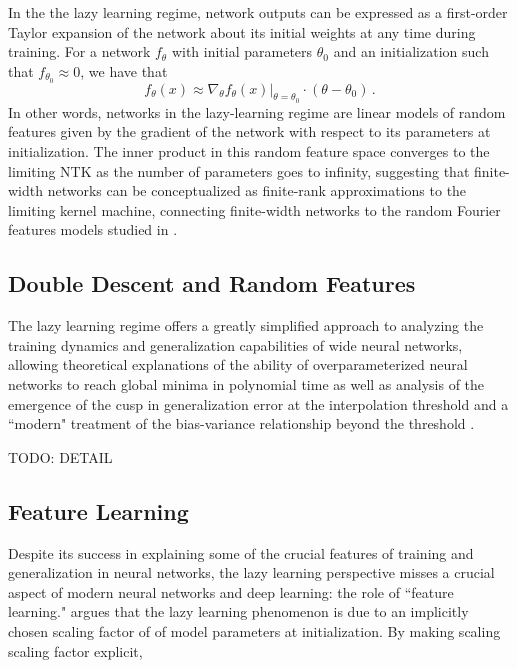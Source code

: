\documentclass[a4paper, 12pt]{article}
\begin{document}
In the the lazy learning regime, network outputs can be expressed as a first-order Taylor expansion of the network about its initial weights \cite{leeWideNeuralNetworks2019} at any time during training. For a network $f_\theta$ with initial parameters $\theta_0$ and an initialization such that $f_{\theta_0} \approx 0$, we have that
\begin{equation}
    f_\theta(x) \approx \nabla_\theta \left.f_\theta(x)\right|_{\theta=\theta_0} \cdot (\theta - \theta_0)\,.
\end{equation}
In other words, networks in the lazy-learning regime are linear models of random features given by the gradient of the network with respect to its parameters at initialization. The inner product in this random feature space converges to the limiting NTK as the number of parameters goes to infinity, suggesting that finite-width networks can be conceptualized as finite-rank approximations to the limiting kernel machine, connecting finite-width networks to the random Fourier features models studied in \cite{rahimiRandomFeaturesLargeScale2008}.

\subsection{Double Descent and Random Features}
The lazy learning regime offers a greatly simplified approach to analyzing the training dynamics and generalization capabilities of wide neural networks, allowing theoretical explanations of the ability of overparameterized neural networks to reach global minima in polynomial time \cite{allen-zhuConvergenceTheoryDeep2019} as well as analysis of the emergence of the cusp in generalization error at the interpolation threshold \cite{meiGeneralizationErrorRandom2019, geigerScalingDescriptionGeneralization2019} and a ``modern" treatment of the bias-variance relationship beyond the threshold \cite{dascoliDoubleTroubleDouble2020}. 

TODO: DETAIL

\subsection{Feature Learning}

Despite its success in explaining some of the crucial features of training and generalization in neural networks, the lazy learning perspective misses a crucial aspect of modern neural networks and deep learning: the role of ``feature learning."  \cite{chizatLazyTrainingDifferentiable2020} argues that the lazy learning phenomenon is due to an implicitly chosen scaling factor of of model parameters at initialization. By making scaling scaling factor explicit, \cite{}
\cite{chizatLazyTrainingDifferentiable2020}
\end{document}

